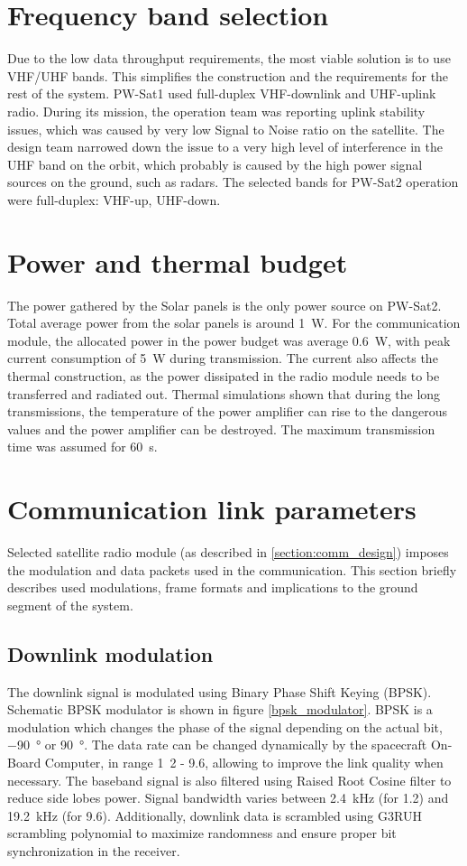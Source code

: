 \section{Frequency band selection}
Due to the low data throughput requirements, the most viable solution is to use VHF/UHF bands. This simplifies the construction and the requirements for the rest of the system.
PW-Sat1 \cite{pwsat1_website_ska} used full-duplex VHF-downlink and UHF-uplink radio. During its mission, the operation team was reporting uplink stability issues, which was caused by very low Signal to Noise ratio on the satellite. The design team narrowed down the issue to a very high level of interference in the UHF band on the orbit, which probably is caused by the high power signal sources on the ground, such as radars. The selected bands for PW-Sat2 operation were full-duplex: VHF-up, UHF-down.

\section{Power and thermal budget}
The power gathered by the Solar panels is the only power source on PW-Sat2. Total average power from the solar panels is around \SI{1}{\watt}. For the communication module, the allocated power in the power budget was average \SI{0.6}{\watt}, with peak current consumption of \SI{5}{\watt} during transmission. The current also affects the thermal construction, as the power dissipated in the radio module needs to be transferred and radiated out. Thermal simulations \cite{PWSAT_TCS_CDR} shown that during the long transmissions, the temperature of the power amplifier can rise to the dangerous values and the power amplifier can be destroyed. The maximum transmission time was assumed for \SI{60}{\second}.

\section{Communication link parameters}
Selected satellite radio module (as described in \autoref{section:comm_design}) imposes the modulation and data packets used in the communication. This section briefly describes used modulations, frame formats and implications to the ground segment of the system.

\subsection{Downlink modulation}
The downlink signal is modulated using Binary Phase Shift Keying (BPSK). Schematic BPSK modulator is shown in figure \ref{bpsk_modulator}. BPSK is a modulation which changes the phase of the signal depending on the actual bit, \SI{-90}{\degree} or \SI{90}{\degree}. The data rate can be changed dynamically by the spacecraft On-Board Computer, in range \si{1.2} - \SI{9.6}{\kbps}, allowing to improve the link quality when necessary. The baseband signal is also filtered using Raised Root Cosine filter to reduce side lobes power. Signal bandwidth varies between \SI{2.4}{\kHz} (for \SI{1.2}{\kbps}) and \SI{19.2}{\kHz} (for \SI{9.6}{\kbps}). Additionally, downlink data is scrambled using G3RUH scrambling polynomial to maximize randomness and ensure proper bit synchronization in the receiver.


